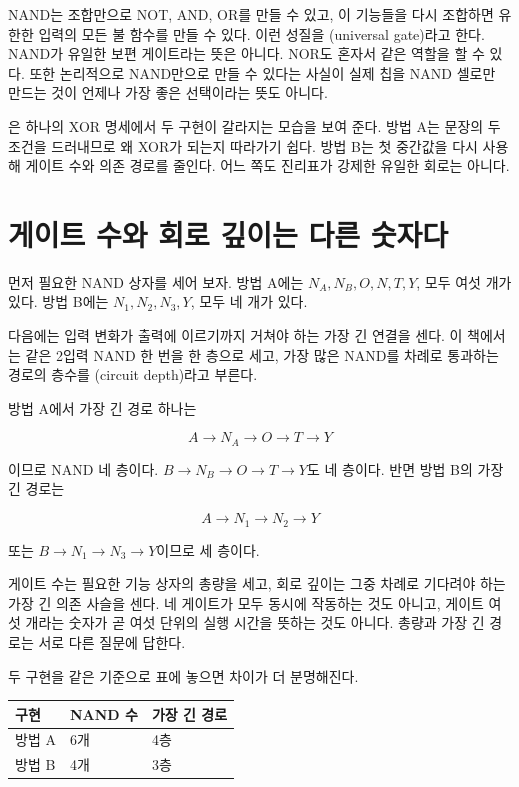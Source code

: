 NAND는 조합만으로 NOT, AND, OR를 만들 수 있고, 이 기능들을 다시 조합하면 유한한 입력의 모든 불 함수를 만들 수 있다. 이런 성질을 (universal gate)라고 한다\parencite{mit6004truth,nand2tetrisproject1}. NAND가 유일한 보편 게이트라는 뜻은 아니다. NOR도 혼자서 같은 역할을 할 수 있다. 또한 논리적으로 NAND만으로 만들 수 있다는 사실이 실제 칩을 NAND 셀로만 만드는 것이 언제나 가장 좋은 선택이라는 뜻도 아니다.



은 하나의 XOR 명세에서 두 구현이 갈라지는 모습을 보여 준다. 방법 A는 문장의 두 조건을 드러내므로 왜 XOR가 되는지 따라가기 쉽다. 방법 B는 첫 중간값을 다시 사용해 게이트 수와 의존 경로를 줄인다. 어느 쪽도 진리표가 강제한 유일한 회로는 아니다.

\section{게이트 수와 회로 깊이는 다른 숫자다}

먼저 필요한 NAND 상자를 세어 보자. 방법 A에는 $N_A,N_B,O,N,T,Y$, 모두 여섯 개가 있다. 방법 B에는 $N_1,N_2,N_3,Y$, 모두 네 개가 있다.

다음에는 입력 변화가 출력에 이르기까지 거쳐야 하는 가장 긴 연결을 센다. 이 책에서는 같은 2입력 NAND 한 번을 한 층으로 세고, 가장 많은 NAND를 차례로 통과하는 경로의 층수를 (circuit depth)라고 부른다.

방법 A에서 가장 긴 경로 하나는

\[
  A \longrightarrow N_A \longrightarrow O \longrightarrow T \longrightarrow Y
\]

이므로 NAND 네 층이다. $B\rightarrow N_B\rightarrow O\rightarrow T\rightarrow Y$도 네 층이다. 반면 방법 B의 가장 긴 경로는

\[
  A \longrightarrow N_1 \longrightarrow N_2 \longrightarrow Y
\]

또는 $B\rightarrow N_1\rightarrow N_3\rightarrow Y$이므로 세 층이다.

게이트 수는 필요한 기능 상자의 총량을 세고, 회로 깊이는 그중 차례로 기다려야 하는 가장 긴 의존 사슬을 센다. 네 게이트가 모두 동시에 작동하는 것도 아니고, 게이트 여섯 개라는 숫자가 곧 여섯 단위의 실행 시간을 뜻하는 것도 아니다. 총량과 가장 긴 경로는 서로 다른 질문에 답한다.

두 구현을 같은 기준으로 표에 놓으면 차이가 더 분명해진다.

\begin{center}
\small
\begin{tabular}{>{\centering\arraybackslash}p{} >{\centering\arraybackslash}p{} >{\centering\arraybackslash}p{}}
\toprule
\sffamily\bfseries 구현 & \sffamily\bfseries NAND 수 & \sffamily\bfseries 가장 긴 경로 \\
\midrule
방법 A & 6개 & 4층 \\
방법 B & 4개 & 3층 \\
\bottomrule
\end{tabular}
\end{center}

